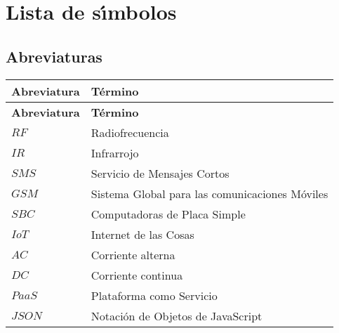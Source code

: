 \chapter*{Lista de s\'{\i}mbolos}

\section*{Abreviaturas}
\begin{longtable}[l]{>{}l<{}l}
  \textbf{Abreviatura} & \textbf{T\'{e}rmino} \\[0.5ex] \hline%
  \endfirsthead%
  \textbf{Abreviatura} & \textbf{T\'{e}rmino} \\[0.5ex] \hline%
  \endhead%
\renewcommand{\arraystretch}{1.4}\label{simbolosg}
 $RF$	 &Radiofrecuencia\\%
 $IR$    &Infrarrojo\\%
 $SMS$   &Servicio de Mensajes Cortos\\%
 $GSM$   &Sistema Global para las comunicaciones Móviles\\%
 $SBC$   &Computadoras de Placa Simple\\%
 $IoT$   &Internet de las Cosas\\%
 $AC$    &Corriente alterna\\%
 $DC$    &Corriente continua\\%
 $PaaS$  &Plataforma como Servicio\\%
 $JSON$  &Notación de Objetos de JavaScript\\%

\end{longtable}


\setlength{\extrarowheight}{0pt}